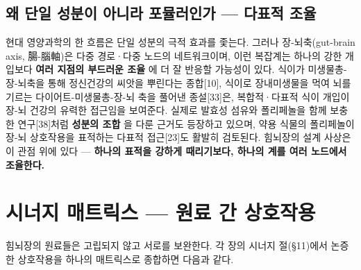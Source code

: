 \documentclass[11pt,oneside]{book}
\begin{document}
\subsection{왜 단일 성분이 아니라 포뮬러인가 — 다표적 조율}
현대 영양과학의 한 흐름은 단일 성분의 극적 효과를 좇는다. 그러나 장-뇌축(gut-brain axis, 腸-腦軸)은 다중 경로·다중 노드의 네트워크이며, 이런 복잡계는 하나의 강한 개입보다 \textbf{여러 지점의 부드러운 조율} 에 더 잘 반응할 가능성이 있다. 식이가 미생물총-장-뇌축을 통해 정신건강의 씨앗을 뿌린다는 종합[10], 식이로 장내미생물을 먹여 뇌를 기르는 다이어트-미생물총-장-뇌 축을 풀어낸 종설[33]은, 복합적·다표적 식이 개입이 장-뇌 건강의 유력한 접근임을 보여준다. 실제로 발효성 섬유와 폴리페놀을 함께 보충한 연구[38]처럼 \textbf{성분의 조합} 을 다룬 근거도 등장하고 있으며, 약용 식물의 폴리페놀이 장-뇌 상호작용을 표적하는 다표적 접근[23]도 활발히 검토된다. 힘뇌장의 설계 사상은 이 관점 위에 있다 — \textbf{하나의 표적을 강하게 때리기보다, 하나의 계를 여러 노드에서 조율한다.}

\section{시너지 매트릭스 — 원료 간 상호작용}
힘뇌장의 원료들은 고립되지 않고 서로를 보완한다. 각 장의 시너지 절(§11)에서 논증한 상호작용을 하나의 매트릭스로 종합하면 다음과 같다.

\vspace{2pt}\vspace{3pt}
\end{document}
